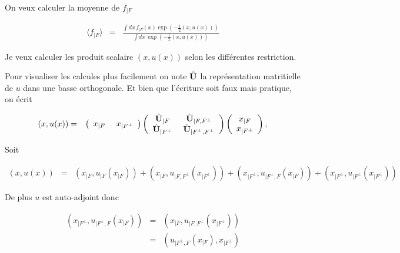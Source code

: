 On veux calculer la moyenne de $f_{\vert F}$

\begin{eqnarray*}
	\langle f_{\vert F } \rangle  & = & \frac{\int d x \, f_{\vert F}(x) \exp \left ( - \frac{1}{2} ( x , u (x)) \right ) }{\int d x \, \exp \left ( - \frac{1}{2} ( x , u (x)) \right )}
\end{eqnarray*}

Je veux calculer les produit scalaire $\left ( x , u (x) \right )$ selon les différentes restriction. 

Pour visualiser les calcules plus facilement on note $\hat{\mathbf{U}}$ la représentation matritielle de $u$ dans une basse orthogonale. Et bien que l'écriture soit faux mais pratique, on écrit 

\begin{eqnarray*}
	\left ( x , u (x) \right ) & = &  \left ( \begin{array}{cc} x_{\vert F } &  x_{\vert F^\perp }  \end{array} \right) \left ( \begin{array}{cc} \operator{U}_{\vert F} & \operator{U}_{\vert F , F^\perp}  \\ \operator{U}_{\vert F^\perp } & \operator{U}_{\vert F^\perp , F^\perp} \end{array} \right ) \left (  \begin{array}{c} x_{\vert F} \\  x_{\vert F^\perp} \end{array} \right ) ,
\end{eqnarray*}

Soit 

\begin{eqnarray*}
	\left ( x , u (x) \right ) & = & \left ( x_{\vert F } , u_{\vert F } \left (x_{\vert F } \right ) \right ) + \left ( x_{\vert F } , u_{\vert F , F^\perp  } \left (x_{\vert F^\perp } \right ) \right )  + \left ( x_{\vert F^\perp } , u_{\vert F^\perp , F  } \left (x_{\vert F } \right ) \right )  + \left ( x_{\vert F^\perp } , u_{\vert F^\perp } \left (x_{\vert F^\perp } \right ) \right ) 		
\end{eqnarray*}

De plus $u$ est auto-adjoint donc 

\begin{eqnarray*}
	\left ( x_{\vert F^\perp } , u_{\vert F^\perp , F  } \left (x_{\vert F } \right ) \right ) & = & \left ( x_{\vert F } , u_{\vert F , F^\perp  } \left (x_{\vert F^\perp } \right ) \right ) \\
	& = & \left ( u_{\vert F^\perp , F   }\left (x_{\vert F } \right )  ,  x_{\vert F^\perp }  \right )
\end{eqnarray*}

